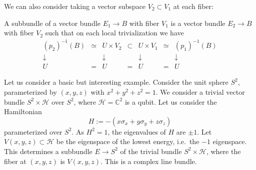 \documentclass[12pt]{article}
\numberwithin{equation}{section}
\def\bC{\mathbb{C}}
\def\cH{\mathcal{H}}
\begin{document}
We can also consider taking a vector subspace $V_2\subset V_1$ at each fiber:
\begin{definition}
A subbundle of a vector bundle $E_1\to B$ with fiber $V_1$ is 
a vector bundle $E_2\to B$ with fiber $V_2$ such that on each local trivialization 
we have 
\begin{equation}
  \begin{array}{cccccccc}
    (p_2)^{-1}(B) &\simeq & U\times V_2 & \subset  & U\times V_1 &\simeq & (p_1)^{-1}(B) \\ 
    \downarrow & & \downarrow & & \downarrow & & \downarrow \\
    U & = & U & = & U & = & U
  \end{array}
  \end{equation}
\end{definition}

Let us consider a basic but interesting example.
Consider the unit sphere $S^2$, parameterized by $(x,y,z)$ with $x^2+y^2+z^2=1$.
We consider a trivial vector bundle $S^2\times \cH$ over $S^2$,
where $\cH=\bC^2$ is a qubit.
Let us consider the Hamiltonian \begin{equation}
  H := -(x\sigma_x +y \sigma_y + z\sigma_z)
  \label{eq:S2Ham}
\end{equation} parameterized over $S^2$.
As $H^2=1$, the eigenvalues of $H$ are $\pm 1$.
Let $V(x,y,z) \subset \cH$ be the eigenspace of the lowest energy, i.e.~the $-1$ eigenspace.
This determines a subbundle $E \to S^2 $ of the trivial bundle $S^2\times \cH$,
where the fiber at $(x,y,z)$ is $V(x,y,z)$.
This is a complex line bundle.
\end{document}
